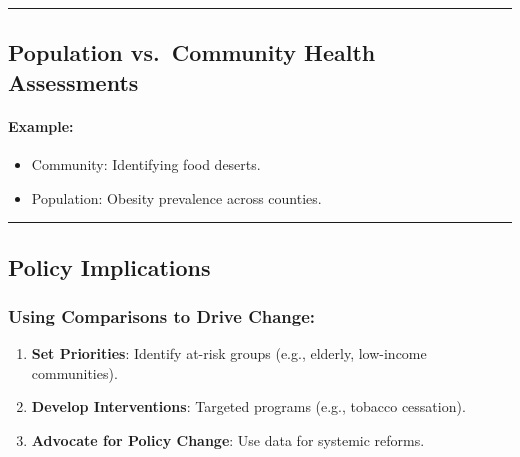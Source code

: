 \documentclass[
  letterpaper,
  DIV=11,
  numbers=noendperiod]{scrartcl}
\let\oldparagraph\paragraph
\renewcommand{\paragraph}[1]{\oldparagraph{#1}\mbox{}}
\providecommand{\tightlist}{%
  \setlength{\itemsep}{0pt}\setlength{\parskip}{0pt}}\usepackage{longtable,booktabs,array}
\begin{document}
\begin{center}\rule{0.5\linewidth}{0.5pt}\end{center}

\hypertarget{population-vs.-community-health-assessments-1}{%
\subsection{\texorpdfstring{{\textbf{Population vs.~Community Health
Assessments}}}{Population vs.~Community Health Assessments}}\label{population-vs.-community-health-assessments-1}}

\hypertarget{example-2}{%
\paragraph{Example:}\label{example-2}}

\begin{itemize}
\tightlist
\item
  Community: Identifying food deserts.\\
\item
  Population: Obesity prevalence across counties.
\end{itemize}

\begin{center}\rule{0.5\linewidth}{0.5pt}\end{center}

\hypertarget{policy-implications}{%
\subsection{\texorpdfstring{{\textbf{Policy
Implications}}}{Policy Implications}}\label{policy-implications}}

\hypertarget{using-comparisons-to-drive-change}{%
\subsubsection{\texorpdfstring{{\textbf{Using Comparisons to Drive
Change}}:}{Using Comparisons to Drive Change:}}\label{using-comparisons-to-drive-change}}

\begin{enumerate}
\def\labelenumi{\arabic{enumi}.}
\tightlist
\item
  \textbf{Set Priorities}: Identify at-risk groups (e.g., elderly,
  low-income communities).\\
\item
  \textbf{Develop Interventions}: Targeted programs (e.g., tobacco
  cessation).\\
\item
  \textbf{Advocate for Policy Change}: Use data for systemic reforms.
\end{enumerate}
\end{document}
